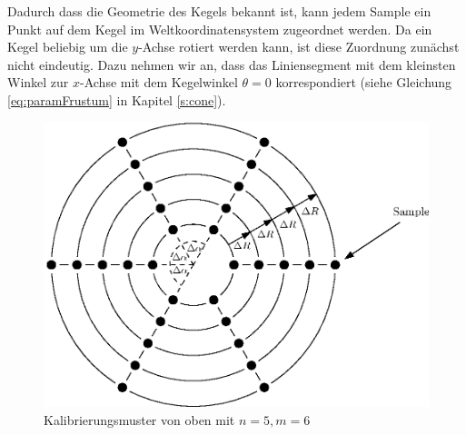 Dadurch dass die Geometrie des Kegels bekannt ist, kann jedem Sample ein Punkt auf dem Kegel im Weltkoordinatensystem zugeordnet werden. Da ein Kegel beliebig um die $y$-Achse rotiert werden kann, ist diese Zuordnung zunächst nicht eindeutig. Dazu nehmen wir an, dass das Liniensegment mit dem kleinsten Winkel zur $x$-Achse mit dem Kegelwinkel $\theta = 0$ korrespondiert (siehe Gleichung \ref{eq:paramFrustum} in Kapitel \ref{s:cone}).

\begin{figure}[!htb]
	\centering
	\includegraphics[scale=.8]{images/calibrationPatternTop.eps}
	\caption{Kalibrierungsmuster von oben mit $n = 5, m = 6$}
	\label{fig:calibrationPatternTop}
\end{figure}


